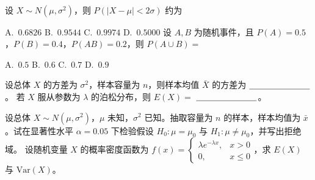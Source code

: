 \documentclass[12pt,a4paper]{exampaper}
\begin{document}

\vspace{0.8em}

\begin{center}
  \hspace{0.4em}%
  \hspace{0.4em}%
  \\[0.4em]
  \hspace{0.4em}%
  \hspace{0.4em}%
\end{center}

\vspace{0.8em}

\examscoretable[4]

\vspace{0.6em}

\begin{examquestions}
  \examquestion 设 $X \sim N(\mu, \sigma^2)$，则 $P(|X-\mu| < 2\sigma)$ 约为

  A.\ $0.6826$ \qquad B.\ $0.9544$ \qquad C.\ $0.9974$ \qquad D.\ $0.5000$
  \examquestion 设 $A,B$ 为随机事件，且 $P(A)=0.5$，$P(B)=0.4$，$P(AB)=0.2$，则 $P(A \cup B)=$

  A.\ $0.5$ \qquad B.\ $0.6$ \qquad C.\ $0.7$ \qquad D.\ $0.9$
\end{examquestions}

\vspace{0.6em}

\begin{examquestions}
  \examquestion 设总体 $X$ 的方差为 $\sigma^2$，样本容量为 $n$，则样本均值 $\bar{X}$ 的方差为 $\underline{\hspace{2.5cm}}$。
  \examquestion 若 $X$ 服从参数为 $\lambda$ 的泊松分布，则 $E(X)=$ $\underline{\hspace{2.5cm}}$。
\end{examquestions}

\vspace{0.6em}

\begin{examquestions}[0pt]
  \examquestion 设总体 $X \sim N(\mu, \sigma^2)$，$\mu$ 未知，$\sigma^2$ 已知。抽取容量为 $n$ 的样本，样本均值为 $\bar{x}$。试在显著性水平 $\alpha=0.05$ 下检验假设 $H_0: \mu = \mu_0$ 与 $H_1: \mu \neq \mu_0$，并写出拒绝域。
  \examanswerspace{7cm}
  \examquestion 设随机变量 $X$ 的概率密度函数为 $f(x) = \begin{cases} \lambda e^{-\lambda x}, & x > 0 \\ 0, & x \leq 0 \end{cases}$，求 $E(X)$ 与 $\mathrm{Var}(X)$。
  \examanswerspace{7cm}
\end{examquestions}
\end{document}
